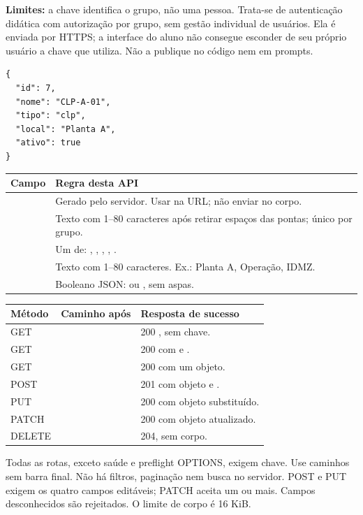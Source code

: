 \textbf{Limites:} a chave identifica o grupo, não uma pessoa. Trata-se de autenticação didática com autorização por grupo, sem gestão individual de usuários. Ela é enviada por HTTPS; a interface do aluno não consegue esconder de seu próprio usuário a chave que utiliza. Não a publique no código nem em prompts.


\begin{lstlisting}
{
  "id": 7,
  "nome": "CLP-A-01",
  "tipo": "clp",
  "local": "Planta A",
  "ativo": true
}
\end{lstlisting}
\begin{tabularx}{\linewidth}{@{}lY@{}}\toprule
Campo & Regra desta API \\\midrule
{} & Gerado pelo servidor. Usar na URL; não enviar no corpo.\\
 & Texto com 1--80 caracteres após retirar espaços das pontas; único por grupo.\\
 & Um de: , , , , .\\
 & Texto com 1--80 caracteres. Ex.: Planta A, Operação, IDMZ.\\
 & Booleano JSON:  ou , sem aspas.\\\bottomrule
\end{tabularx}

\begin{tabularx}{\linewidth}{@{}llY@{}}\toprule
Método & Caminho após  & Resposta de sucesso \\\midrule
GET &  & 200 , sem chave.\\
GET &  & 200 com  e .\\
GET &  & 200 com um objeto.\\
POST &  & 201 com objeto e .\\
PUT &  & 200 com objeto substituído.\\
PATCH &  & 200 com objeto atualizado.\\
DELETE &  & 204, sem corpo.\\\bottomrule
\end{tabularx}
Todas as rotas, exceto saúde e preflight OPTIONS, exigem chave. Use caminhos sem barra final. Não há filtros, paginação nem busca no servidor. POST e PUT exigem os quatro campos editáveis; PATCH aceita um ou mais. Campos desconhecidos são rejeitados. O limite de corpo é 16 KiB.

